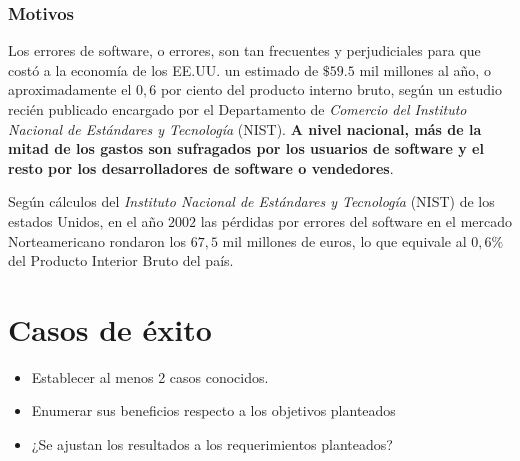 \documentclass[titlepage,a4paper,twoside]{article}
\theoremstyle{definition}
\numberwithin{algorithm}{section}
\theoremstyle{remark}
\numberwithin{equation}{section}
\begin{document}
   
    \subsubsection{Motivos}
   
    
    Los errores de software, o errores, son tan frecuentes y perjudiciales para que costó a la economía de los EE.UU. un estimado de $\$ 59.5$ mil millones al año, o aproximadamente el $0,6$ por ciento del producto interno bruto, según un estudio recién publicado encargado por el Departamento de \textit{Comercio del Instituto Nacional de Estándares y Tecnología} (NIST). \textbf{A nivel nacional, más de la mitad de los gastos son sufragados por los usuarios de software y el resto por los desarrolladores de software o vendedores}.
    
    Según cálculos del \textit{Instituto Nacional de Estándares y Tecnología} (NIST) de los  estados Unidos, en el año $2002$ las pérdidas por errores del software en el mercado Norteamericano rondaron los $67,5$ mil millones de euros, lo que equivale al $0,6\%$ del Producto Interior Bruto del país.    
    
   
   

    \section{Casos de éxito}
    
    \begin{itemize}
    	\item Establecer al menos 2 casos conocidos.
    	\item Enumerar sus beneficios respecto a los objetivos planteados
    	\item ¿Se ajustan los resultados a los requerimientos planteados?
    \end{itemize}
\end{document}

